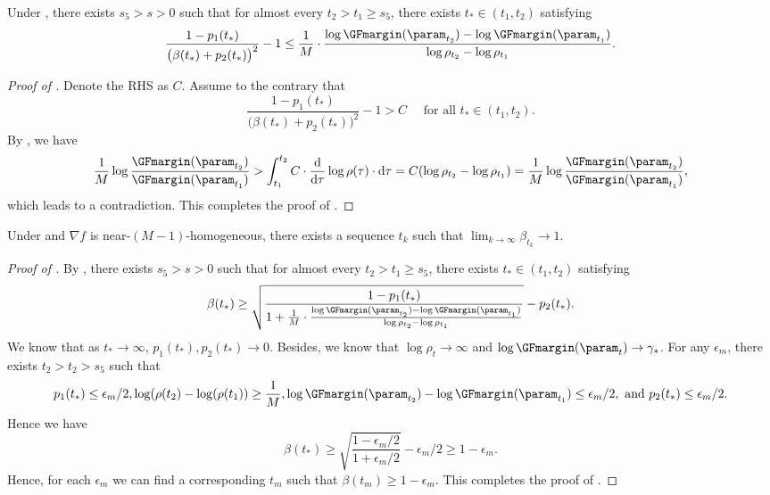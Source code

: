 \begin{corollary}
\label{cor: beta bound}
Under , there exists $s_5>s>0$ such that for almost every $t_2>t_1\ge s_5$, there exists $t_*\in (t_1, t_2)$ satisfying
\[
    \frac{1 - p_1(t_*)}{\big(\beta(t_*) + p_2(t_*) \big)^2}-1 \le \frac{1}{M} \cdot \frac{\log \GFmargin(\param_{t_2}) - \log\GFmargin(\param_{t_1})}{\log \rho_{t_2} - \log \rho_{t_1}}. 
\]
\end{corollary}
\begin{proof}[Proof of ]
Denote the RHS as $C$. Assume to the contrary that 
\[
    \frac{1 - p_1(t_*)}{\big(\beta(t_*) + p_2(t_*) \big)^2}-1 > C \quad \text{ for all } t_*\in (t_1, t_2).
\]
By , we have 
\[
    \frac{1}{M} \log \frac{\GFmargin(\param_{t_2})}{\GFmargin(\param_{t_1})} > \int_{t_1}^{t_2} C \cdot \frac{\mathrm{d} }{\mathrm{d} \tau} \log \rho(\tau) \cdot \mathrm{d} \tau = C( \log \rho_{t_2} - \log \rho_{t_1}) = \frac{1}{M}\log \frac{\GFmargin(\param_{t_2})}{\GFmargin(\param_{t_1})},
\]
which leads to a contradiction. This completes the proof of .
\end{proof}

\begin{lemma}
\label{lem: beta goes to 1}
Under  and $\nabla f$ is near-$(M-1)$-homogeneous,  there exists a sequence $t_k$ such that $\lim_{k\to \infty}\beta_{t_k} \to 1$.
\end{lemma}
\begin{proof}[Proof of ]
By , there exists $s_5 >s>0$  such that for almost every $t_2>t_1\ge s_5$, there exists $t_*\in (t_1, t_2)$ satisfying 
\[
    \beta(t_*) \ge \sqrt{  \frac{1-p_1(t_*)}{1+ \frac{1}{M} \cdot \frac{\log \GFmargin(\param_{t_2}) - \log\GFmargin(\param_{t_1})}{\log \rho_{t_2} - \log \rho_{t_1}}}} - p_2(t_*).
\]
We know that as $t_* \to \infty$, $p_1(t_*), p_2(t_*) \to 0$.  Besides, we know that $\log \rho_t \to \infty$ and $\log \GFmargin(\param_t) \to \gamma_*$. For any $\epsilon_m$, there exists $t_2 >t_2 >s_5$ such that 
\[
    p_1(t_*) \le \epsilon_m/2, \log(\rho(t_2) - \log(\rho(t_1)) \ge \frac{1}{M}, \log \GFmargin(\param_{t_2}) - \log \GFmargin(\param_{t_1}) \le \epsilon_m /2, \text{ and } p_2(t_*) \le \epsilon_m/2. 
\]
Hence we have 
\[
    \beta(t_*) \ge \sqrt{\frac{1-\epsilon_m/2}{1+\epsilon _m /2}} - \epsilon_m/2 \ge 1 - \epsilon _m. 
\]
Hence, for each $\epsilon _m$ we can find a corresponding $t_m$ such that $\beta(t_m) \ge 1 - \epsilon_m$. This completes the proof of .
\end{proof}

